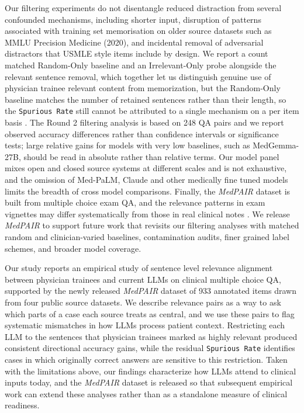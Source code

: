 \documentclass[fleqn,10pt]{wlscirep}
\def\ourmetric{\texttt{Spurious Rate}\xspace}
\begin{document}
Our filtering experiments do not disentangle reduced distraction from several confounded mechanisms, including shorter input, disruption of patterns associated with training set memorisation on older source datasets such as MMLU Precision Medicine (2020), and incidental removal of adversarial distractors that USMLE style items include by design. We report a count matched Random-Only baseline and an Irrelevant-Only probe alongside the relevant sentence removal, which together let us distinguish genuine use of physician trainee relevant content from memorization, but the Random-Only baseline matches the number of retained sentences rather than their length, so the \ourmetric still cannot be attributed to a single mechanism on a per item basis \cite{gu_survey_2025, panickssery_llm_2024, radevski2025synthesizing, zuccon2023chatgpt}. The Round 2 filtering analysis is based on 248 QA pairs and we report observed accuracy differences rather than confidence intervals or significance tests; large relative gains for models with very low baselines, such as MedGemma-27B, should be read in absolute rather than relative terms. Our model panel mixes open and closed source systems at different scales and is not exhaustive, and the omission of Med-PaLM, Claude and other medically fine tuned models limits the breadth of cross model comparisons. Finally, the \emph{MedPAIR} dataset is built from multiple choice exam QA, and the relevance patterns in exam vignettes may differ systematically from those in real clinical notes \cite{croxford_current_2025, sharma_relevance_2017}. We release \emph{MedPAIR} to support future work that revisits our filtering analyses with matched random and clinician-varied baselines, contamination audits, finer grained label schemes, and broader model coverage.

Our study reports an empirical study of sentence level relevance alignment between physician trainees and current LLMs on clinical multiple choice QA, supported by the newly released \emph{MedPAIR} dataset of 933 annotated items drawn from four public source datasets. We describe relevance pairs as a way to ask which parts of a case each source treats as central, and we use these pairs to flag systematic mismatches in how LLMs process patient context. Restricting each LLM to the sentences that physician trainees marked as highly relevant produced consistent directional accuracy gains, while the residual \ourmetric identifies cases in which originally correct answers are sensitive to this restriction. Taken with the limitations above, our findings characterize how LLMs attend to clinical inputs today, and the \emph{MedPAIR} dataset is released so that subsequent empirical work can extend these analyses rather than as a standalone measure of clinical readiness. %
\end{document}
